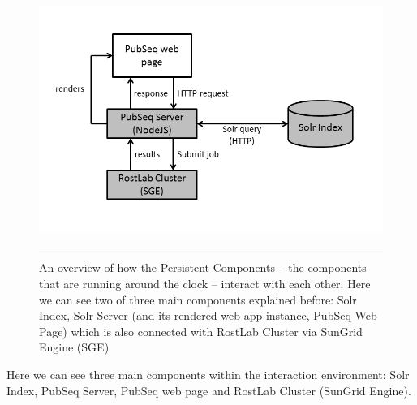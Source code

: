 \begin{figure}[htbp]
  \centering
    \includegraphics[width=6in]{Figures/solr_graph_main.png}
    \rule{35em}{0.5pt}
  \caption[An Overview of how the 'Persistent Components' of PubSeq environment interacts.]{An overview of how the Persistent Components -- the components that are running around the clock -- interact with each other. Here we can see two of three main components explained before: Solr Index, Solr Server (and its rendered web app instance, PubSeq Web Page) which is also connected with RostLab Cluster via SunGrid Engine (SGE)}
  \label{fig:ComponentInteraction}
\end{figure}

Here we can see three main components within the interaction environment: Solr Index, PubSeq Server, PubSeq web page and RostLab Cluster (SunGrid Engine).


